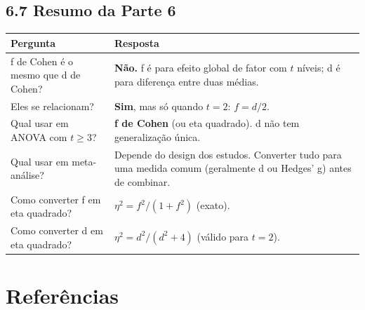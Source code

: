 \documentclass[
]{article}
\newcounter{none} %
\begin{document}
\subsection{6.7 Resumo da Parte 6}\label{resumo-da-parte-6}

{\def\LTcaptype{none} %
\begin{longtable}[]{@{}
  >{\raggedright\arraybackslash}p{}
  >{\raggedright\arraybackslash}p{}@{}}
\toprule\noalign{}
\begin{minipage}[b]{\linewidth}\raggedright
Pergunta
\end{minipage} & \begin{minipage}[b]{\linewidth}\raggedright
Resposta
\end{minipage} \\
\midrule\noalign{}
\endhead
\bottomrule\noalign{}
\endlastfoot
f de Cohen é o mesmo que d de Cohen? & \textbf{Não.} f é para efeito
global de fator com \(t\) níveis; d é para diferença entre duas
médias. \\
Eles se relacionam? & \textbf{Sim}, mas só quando \(t = 2\):
\(f = d/2\). \\
Qual usar em ANOVA com \(t \geq 3\)? & \textbf{f de Cohen} (ou eta
quadrado). d não tem generalização única. \\
Qual usar em meta-análise? & Depende do design dos estudos. Converter
tudo para uma medida comum (geralmente d ou Hedges' g) antes de
combinar. \\
Como converter f em eta quadrado? & \(\eta^2 = f^2 / (1 + f^2)\)
(exato). \\
Como converter d em eta quadrado? & \(\eta^2 = d^2 / (d^2 + 4)\) (válido
para \(t = 2\)). \\
\end{longtable}
}

\section{Referências}\label{referuxeancias}
\end{document}
